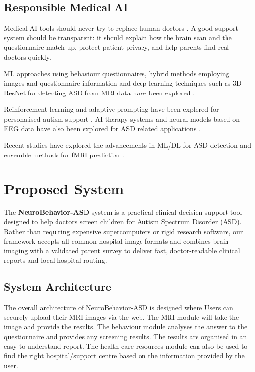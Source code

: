 \documentclass[conference]{IEEEtran}
\begin{document}
\subsection{Responsible Medical AI}
Medical AI tools should never try to replace human doctors \cite{parpinelli2026}. A good support system should be transparent: it should explain how the brain scan and the questionnaire match up, protect patient privacy, and help parents find real doctors quickly.

ML approaches using behaviour questionnaires, hybrid methods employing images and questionnaire information and deep learning techniques such as 3D-ResNet for detecting ASD from MRI data have been explored \cite{khan2025, rajkumar2025, yugander2026}.

Reinforcement learning and adaptive prompting have been explored for personalised autism support \cite{tasmi2026, dhar2026, bai2026}. AI therapy systems and neural models based on EEG data have also been explored for ASD related applications \cite{atturu2025, nour2026, rekik2026, ligin2025}.

Recent studies have explored the advancements in ML/DL for ASD detection and ensemble methods for fMRI prediction \cite{chen2026, mishra2026, rohilla2024, ahmed2025, thakur2025}.

\section{Proposed System}
The \textbf{NeuroBehavior-ASD} system is a practical clinical decision support tool designed to help doctors screen children for Autism Spectrum Disorder (ASD). Rather than requiring expensive supercomputers or rigid research software, our framework accepts all common hospital image formats and combines brain imaging with a validated parent survey to deliver fast, doctor-readable clinical reports and local hospital routing.

\subsection{System Architecture}
The overall architecture of NeuroBehavior-ASD is designed where Users can securely upload their MRI images via the web. The MRI module will take the image and provide the results. The behaviour module analyses the answer to the questionnaire and provides any screening results. The results are organised in an easy to understand report. The health care resources module can also be used to find the right hospital/support centre based on the information provided by the user.
\end{document}
